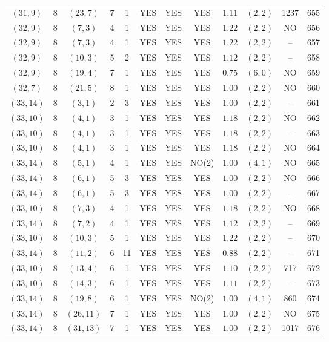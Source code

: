 \begin{longtable}{|c|c|c|c|c|c|c|c|c|c|c|c|}
$(31,9)$ & 8 & $(23,7)$ & 7 & 1 & YES & YES & YES & $1.11$ & $(2,2)$ & 1237 & 655\\
$(32,9)$ & 8 & $(7,3)$ & 4 & 1 & YES & YES & YES & $1.22$ & $(2,2)$ & NO & 656\\
$(32,9)$ & 8 & $(7,3)$ & 4 & 1 & YES & YES & YES & $1.22$ & $(2,2)$ & -- & 657\\
$(32,9)$ & 8 & $(10,3)$ & 5 & 2 & YES & YES & YES & $1.12$ & $(2,2)$ & -- & 658\\
$(32,9)$ & 8 & $(19,4)$ & 7 & 1 & YES & YES & YES & $0.75$ & $(6,0)$ & NO & 659\\
$(32,7)$ & 8 & $(21,5)$ & 8 & 1 & YES & YES & YES & $1.00$ & $(2,2)$ & NO & 660\\
$(33,14)$ & 8 & $(3,1)$ & 2 & 3 & YES & YES & YES & $1.00$ & $(2,2)$ & -- & 661\\
$(33,10)$ & 8 & $(4,1)$ & 3 & 1 & YES & YES & YES & $1.18$ & $(2,2)$ & NO & 662\\
$(33,10)$ & 8 & $(4,1)$ & 3 & 1 & YES & YES & YES & $1.18$ & $(2,2)$ & -- & 663\\
$(33,10)$ & 8 & $(4,1)$ & 3 & 1 & YES & YES & YES & $1.18$ & $(2,2)$ & NO & 664\\
$(33,14)$ & 8 & $(5,1)$ & 4 & 1 & YES & YES & NO(2) & $1.00$ & $(4,1)$ & NO & 665\\
$(33,14)$ & 8 & $(6,1)$ & 5 & 3 & YES & YES & YES & $1.00$ & $(2,2)$ & NO & 666\\
$(33,14)$ & 8 & $(6,1)$ & 5 & 3 & YES & YES & YES & $1.00$ & $(2,2)$ & -- & 667\\
$(33,10)$ & 8 & $(7,3)$ & 4 & 1 & YES & YES & YES & $1.18$ & $(2,2)$ & NO & 668\\
$(33,14)$ & 8 & $(7,2)$ & 4 & 1 & YES & YES & YES & $1.12$ & $(2,2)$ & -- & 669\\
$(33,10)$ & 8 & $(10,3)$ & 5 & 1 & YES & YES & YES & $1.22$ & $(2,2)$ & -- & 670\\
$(33,14)$ & 8 & $(11,2)$ & 6 & 11 & YES & YES & YES & $0.88$ & $(2,2)$ & -- & 671\\
$(33,10)$ & 8 & $(13,4)$ & 6 & 1 & YES & YES & YES & $1.10$ & $(2,2)$ & 717 & 672\\
$(33,10)$ & 8 & $(14,3)$ & 6 & 1 & YES & YES & YES & $1.11$ & $(2,2)$ & -- & 673\\
$(33,14)$ & 8 & $(19,8)$ & 6 & 1 & YES & YES & NO(2) & $1.00$ & $(4,1)$ & 860 & 674\\
$(33,14)$ & 8 & $(26,11)$ & 7 & 1 & YES & YES & YES & $1.00$ & $(2,2)$ & NO & 675\\
$(33,14)$ & 8 & $(31,13)$ & 7 & 1 & YES & YES & YES & $1.00$ & $(2,2)$ & 1017 & 676\\

\end{longtable}
